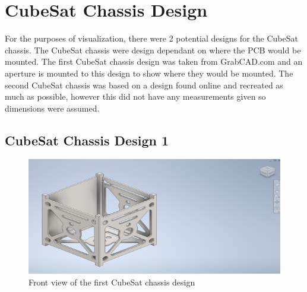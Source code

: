 \section{CubeSat Chassis Design}


For the purposes of visualization, there were 2 potential designs for the CubeSat chassis. 
The CubeSat chassis were design dependant on where the PCB would be mounted. 
The first CubeSat chassis design was taken from GrabCAD.com and an aperture is mounted to this design to show where they would be mounted. 
The second CubeSat chassis was based on a design found online and recreated as much as possible, however this did not have any measurements given so dimensions were assumed.

\subsection{CubeSat Chassis Design 1}

\begin{figure}[htbp]
    \centering
    \includegraphics[width=\textwidth]{chapters/methodology/CubeSatDesign/Fig1CAD.png}
    \caption{Front view of the first CubeSat chassis design}
    \label{fig:cubesat-chassis1-front}
    \end{figure}

